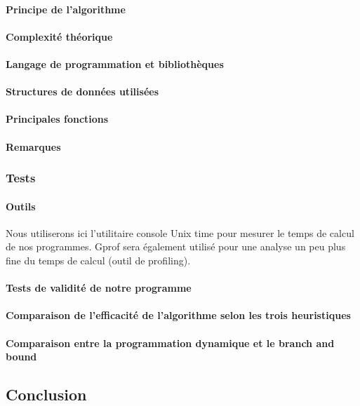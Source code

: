\documentclass[a4paper, 12pt]{article}
\begin{document}
\paragraph{Principe de l'algorithme}

\paragraph{Complexité théorique}

\paragraph{Langage de programmation et bibliothèques}

\paragraph{Structures de données utilisées}

\paragraph{Principales fonctions}

\paragraph{Remarques}

\subsubsection{Tests}

\paragraph{Outils}

Nous utiliserons ici l'utilitaire console Unix time pour mesurer le
temps de calcul de nos programmes. Gprof sera également utilisé pour
une analyse un peu plus fine du temps de calcul (outil de profiling).

\paragraph{Tests de validité de notre programme}

\paragraph{Comparaison de l'efficacité de l'algorithme selon les
  trois heuristiques}


\paragraph{Comparaison entre la programmation dynamique et le branch and bound}

\subsection{Conclusion}
\end{document}

